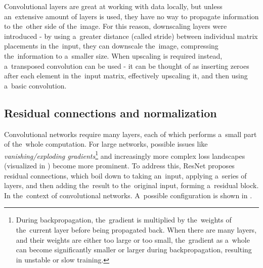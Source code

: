

Convolutional layers are great at working with data locally, but unless an~extensive amount of layers is used, they have no way to propagate information to the~other side of the~image. For this reason, downscaling layers were introduced - by using a~greater distance (called stride) between individual matrix placements in the~input, they can downscale the~image, compressing the~information to a~smaller size. When upscaling is required instead, a~transposed convolution can be used - it can be thought of as inserting zeroes after each element in the~input matrix, effectively upscaling it, and then using a~basic convolution.



\subsection{Residual connections and normalization}

Convolutional networks require many layers, each of which performs a~small part of the~whole computation. For large networks, possible issues like \textit{vanishing/exploding gradients}\footnote{During backpropagation, the~gradient is multiplied by the~weights of the~current layer before being propagated back. When there are many layers, and their weights are either too large or too small, the~gradient as a~whole can become significantly smaller or larger during backpropagation, resulting in unstable or slow training.} and increasingly more complex loss landscapes (visualized in \citep{loss_landscape}) become more prominent. To address this, ResNet \citep{resnet} proposes residual connections, which boil down to taking an~input, applying a~series of layers, and then adding the~result to the~original input, forming a~residual block. In the~context of convolutional networks. A~possible configuration is shown in .



